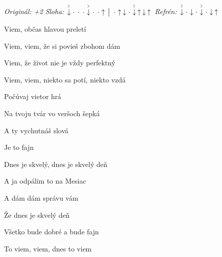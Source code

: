 \begin{song}


\begin{headerbox}
\RaiseBoxWithAccents
\textit{Originál: +2} \quad
\textit{Sloha:} $\AccentDown\Miss\Miss\Miss\AccentDown\Miss\Miss\Up \Separator \Miss\Up\Down\Miss\AccentDown\Up\Down\Up$ \quad
\textit{Refrén:} $\AccentDown\Miss\Down\Miss\AccentDown\Miss\Down\Up$
\end{headerbox}

\begin{hchordbox}
\end{hchordbox}

\Large

\bigskip

 Viem, občas hlavou preletí \par
Viem, viem, že si povieš zbohom dám  \par
{} Viem, že život nie je vždy perfektný \par
Viem, viem, niekto sa potí, niekto vzdá  \par

\bigskip

\begin{chorusbox}{\PredrefrenARefren}
Počúvaj vietor hrá  \par
{}Na tvoju tvár vo veršoch šepká \par
A ty vychutnáš slová \par
Je to fajn \par

\bigskip

Dnes je skvelý, dnes je skvelý deň \par
A ja odpálim to na Mesiac \par
A dám dám správu vám \par

\bigskip

Že dnes je skvelý deň \par
Všetko bude dobré a bude fajn \par
To viem, viem, dnes to viem \par
\end{chorusbox}


\end{song}

